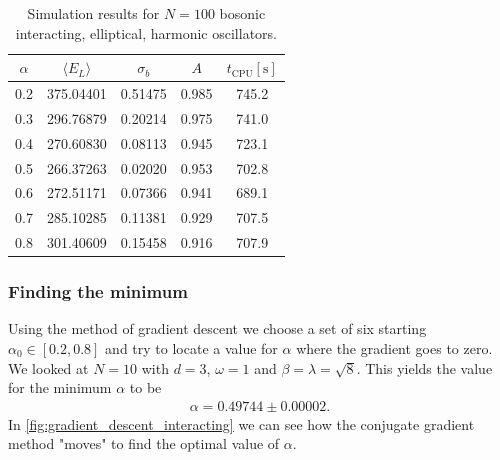 \documentclass[
    a4paper, aps, twocolumn, floatfix, superscriptaddress,
    nofootinbib]{revtex4-1}
\newcommand{\1}{\mathds{1}}
\begin{document}
        \begin{table}
            \caption{Simulation results for $N = 100$ bosonic interacting,
            elliptical, harmonic oscillators.}
            \centering
            \begin{ruledtabular}
                \begin{tabular}{ccccc}
                    $\alpha$ & $\langle  E_L\rangle$ & $\sigma_b$
                    &$A$ & $t_{\text{CPU}} [\si{\second}]$ \\
                    \hline
                    0.2&375.04401&0.51475&0.985%
                    &745.2\\%
                    0.3&296.76879&0.20214&0.975%
                    &741.0\\%
                    0.4&270.60830&0.08113&0.945%
                    &723.1\\%
                    0.5&266.37263&0.02020&0.953%
                    &702.8\\%
                    0.6&272.51171&0.07366&0.941%
                    &689.1\\%
                    0.7&285.10285&0.11381&0.929%
                    &707.5\\%
                    0.8&301.40609&0.15458&0.916%
                    &707.9\\%
                \end{tabular}
            \end{ruledtabular}
            \label{tab:100_interacting}
        \end{table}

        \subsubsection{Finding the minimum}
            Using the method of gradient descent we choose a set of six starting
            $\alpha_0 \in [0.2, 0.8]$ and try to locate a value for $\alpha$
            where the gradient goes to zero. We looked at $N = 10$ with $d = 3$,
            $\omega = 1$ and $\beta = \lambda = \sqrt{8}$. This yields the value
            for the minimum $\alpha$ to be
            \begin{align}
                \alpha = 0.49744 \pm 0.00002.
                \label{eq:optimal_interacting_alpha}
            \end{align}
            In \autoref{fig:gradient_descent_interacting} we can see how the
            conjugate gradient method "moves" to find the optimal value of
            $\alpha$.
\end{document}

